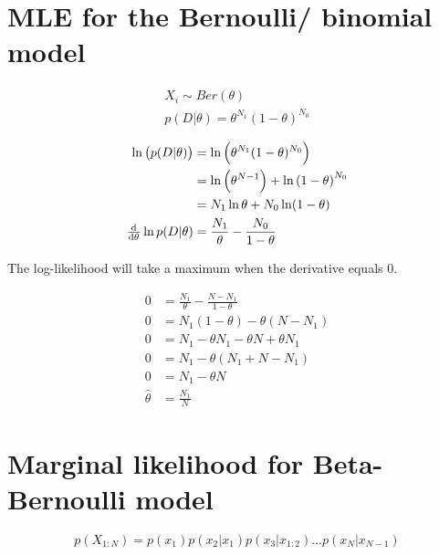 \documentclass{article}
\begin{document}
\def\ci{\perp\!\!\!\perp}
\def\defeq{\buildrel\triangle\over =}
\def\E{\mathrm{E}}
\def\Var{\mathrm{Var}}
\def\Cov{\mathrm{Cov}}
\newcommand\numberthis{\stepcounter{equation}\tag{\theequation}}


\section{MLE for the Bernoulli/ binomial model}

\begin{gather}
X_i \sim Ber(\theta) \\
p(D|\theta) = \theta^{N_1}(1 - \theta)^{N_0}
\end{gather}

\begin{align*}
  \ln \left(  p(D|\theta) \right) &= \ln \left( \theta^{N_1}(1 -
                                    \theta)^{N_0} \right) \\
                                  &= \ln \left( \theta^{N-1} \right) + \ln \left( 1 - \theta
                                    \right)^{N_0} \\
                                  &= N_1 \ln \theta + N_0 \ln (1 - \theta) \\
  \od{}{\theta} \ln p(D|\theta) &= \frac{N_1}{\theta} - \frac{N_0}{1 -
                                  \theta}
\end{align*}

The log-likelihood will take a maximum when the derivative equals 0.

\begin{align*}
  0 &= \frac{N_1}{\theta} - \frac{N - N_1}{1 - \theta} \\
  0 &= N_1(1 - \theta) - \theta(N-N_1) \\
  0 &= N_1 - \theta N_1 - \theta N + \theta N_1 \\
  0 &= N_1 - \theta(N_1 + N - N_1) \\
  0 &= N_1 - \theta N \\
  \hat{\theta} &= \frac{N_1}{N}
\end{align*}
\section{Marginal likelihood for Beta-Bernoulli model}\label{3.2}
\begin{equation}\label{chain-rule-prob}
  p(X_{1:N}) = p(x_1)p(x_2|x_1)p(x_3|x_{1:2}) ... p(x_N|x_{N-1})
\end{equation}
\end{document}
